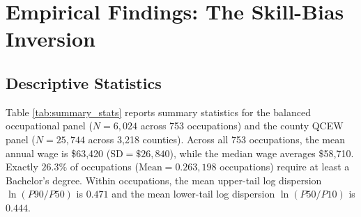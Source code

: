 \documentclass[12pt]{article}
\begin{document}
\section{Empirical Findings: The Skill-Bias Inversion}
\label{sec:results}

\subsection{Descriptive Statistics}

Table \ref{tab:summary_stats} reports summary statistics for the balanced occupational panel ($N = 6,024$ across 753 occupations) and the county QCEW panel ($N = 25,744$ across 3,218 counties). Across all 753 occupations, the mean annual wage is \$63,420 ($\text{SD} = \$26,840$), while the median wage averages \$58,710. Exactly $26.3\%$ of occupations ($\text{Mean} = 0.263, 198$ occupations) require at least a Bachelor's degree. Within occupations, the mean upper-tail log dispersion $\ln(P90/P50)$ is $0.471$ and the mean lower-tail log dispersion $\ln(P50/P10)$ is $0.444$.
\end{document}
